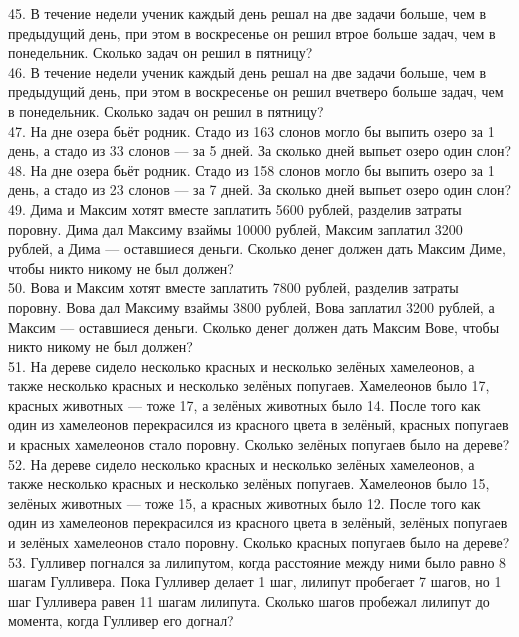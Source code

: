 \documentclass[12pt]{article}
\begin{document}
45. В течение недели ученик каждый день решал на две задачи больше, чем в предыдущий день, при этом в воскресенье он решил втрое больше задач, чем в понедельник. Сколько задач он решил в пятницу?\\
46. В течение недели ученик каждый день решал на две задачи больше, чем в предыдущий день, при этом в воскресенье он решил вчетверо больше задач, чем в понедельник. Сколько задач он решил в пятницу?\\
47. На дне озера бьёт родник. Стадо из 163 слонов могло бы выпить озеро за 1 день, а стадо из 33 слонов --- за 5 дней. За сколько дней выпьет озеро один слон?\\
48. На дне озера бьёт родник. Стадо из 158 слонов могло бы выпить озеро за 1 день, а стадо из 23 слонов --- за 7 дней. За сколько дней выпьет озеро один слон?\\
49. Дима и Максим хотят вместе заплатить 5600 рублей, разделив затраты поровну. Дима дал Максиму взаймы 10000 рублей, Максим заплатил 3200 рублей, а Дима --- оставшиеся деньги. Сколько денег должен дать Максим Диме, чтобы никто никому не был должен?\\
50. Вова и Максим хотят вместе заплатить 7800 рублей, разделив затраты поровну. Вова дал Максиму взаймы 3800 рублей, Вова заплатил 3200 рублей, а Максим --- оставшиеся деньги. Сколько денег должен дать Максим Вове, чтобы никто никому не был должен?\\
51. На дереве сидело несколько красных и несколько зелёных хамелеонов, а также несколько красных и несколько зелёных попугаев. Хамелеонов было 17, красных животных --- тоже 17, а зелёных животных было 14. После того как один из хамелеонов перекрасился из красного цвета в зелёный, красных попугаев и красных хамелеонов стало поровну. Сколько зелёных попугаев было на дереве?\\
52. На дереве сидело несколько красных и несколько зелёных хамелеонов, а также несколько красных и несколько зелёных попугаев. Хамелеонов было 15, зелёных животных --- тоже 15, а красных животных было 12. После того как один из хамелеонов перекрасился из красного цвета в зелёный, зелёных попугаев и зелёных хамелеонов стало поровну. Сколько красных попугаев было на дереве?\\
53. Гулливер погнался за лилипутом, когда расстояние между ними было равно 8 шагам Гулливера. Пока Гулливер делает 1 шаг, лилипут пробегает 7 шагов, но 1 шаг Гулливера равен 11 шагам лилипута. Сколько шагов пробежал лилипут до момента, когда Гулливер его догнал?\\
\end{document}
